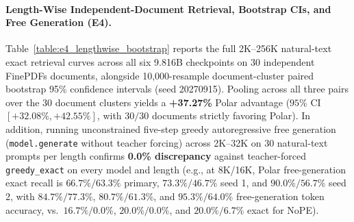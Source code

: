 \begin{revblock}
\paragraph{Length-Wise Independent-Document Retrieval, Bootstrap CIs, and Free Generation (E4).}
Table~\ref{table:e4_lengthwise_bootstrap} reports the full 2K--256K natural-text exact retrieval curves across all six 9.816B checkpoints on 30 independent FinePDFs documents, alongside 10,000-resample document-cluster paired bootstrap 95\% confidence intervals (seed 20270915). Pooling across all three pairs over the 30 document clusters yields a \textbf{+37.27\%} Polar advantage ($95\%$ CI $[+32.08\%,+42.55\%]$, with $30/30$ documents strictly favoring Polar). In addition, running unconstrained five-step greedy autoregressive free generation (\texttt{model.generate} without teacher forcing) across 2K--32K on 30 natural-text prompts per length confirms \textbf{0.0\% discrepancy} against teacher-forced \texttt{greedy\_exact} on every model and length (e.g., at 8K/16K, Polar free-generation exact recall is $66.7\%/63.3\%$ primary, $73.3\%/46.7\%$ seed 1, and $90.0\%/56.7\%$ seed 2, with $84.7\%/77.3\%$, $80.7\%/61.3\%$, and $95.3\%/64.0\%$ free-generation token accuracy, vs.\ $16.7\%/0.0\%$, $20.0\%/0.0\%$, and $20.0\%/6.7\%$ exact for NoPE).


\end{revblock}
